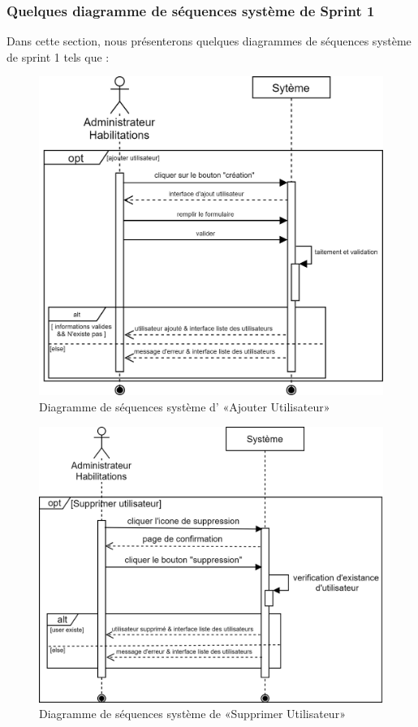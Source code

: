 \subsubsection{Quelques diagramme de séquences système de Sprint 1}
Dans cette section, nous présenterons quelques diagrammes de séquences système de sprint 1 tels que : \newpage
{}
\begin{figure}[H]
	\centering
	\includegraphics[width=0.65\linewidth]{img/conception/sequences/add-user}
	\caption[Diagramme de séquences système d’ «Ajouter Utilisateur»]{Diagramme de séquences système d’ «Ajouter Utilisateur»}
	\label{fig:add-user}
\end{figure}

\begin{figure}[H]
	\centering
	\includegraphics[width=0.65\linewidth]{img/conception/sequences/delete-user}
	\caption[Diagramme de séquences système de «Supprimer Utilisateur»]{Diagramme de séquences système de «Supprimer Utilisateur»}
	\label{fig:delete-user}
\end{figure}

